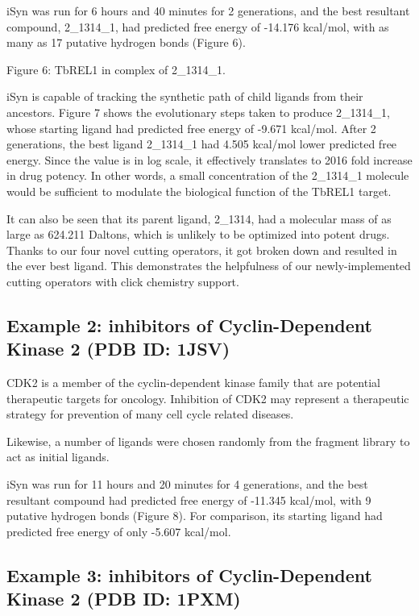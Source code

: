 iSyn was run for 6 hours and 40 minutes for 2 generations, and the best resultant compound, 2\_1314\_1, had predicted free energy of -14.176 kcal/mol, with as many as 17 putative hydrogen bonds (Figure 6).

 
Figure 6: TbREL1 in complex of 2\_1314\_1.

iSyn is capable of tracking the synthetic path of child ligands from their ancestors. Figure 7 shows the evolutionary steps taken to produce 2\_1314\_1, whose starting ligand had predicted free energy of -9.671 kcal/mol. After 2 generations, the best ligand 2\_1314\_1 had 4.505 kcal/mol lower predicted free energy. Since the value is in log scale, it effectively translates to 2016 fold increase in drug potency. In other words, a small concentration of the 2\_1314\_1 molecule would be sufficient to modulate the biological function of the TbREL1 target.

It can also be seen that its parent ligand, 2\_1314, had a molecular mass of as large as 624.211 Daltons, which is unlikely to be optimized into potent drugs. Thanks to our four novel cutting operators, it got broken down and resulted in the ever best ligand. This demonstrates the helpfulness of our newly-implemented cutting operators with click chemistry support.

\subsection{Example 2: inhibitors of Cyclin-Dependent Kinase 2 (PDB ID: 1JSV)}

CDK2 is a member of the cyclin-dependent kinase family that are potential therapeutic targets for oncology. Inhibition of CDK2 may represent a therapeutic strategy for prevention of many cell cycle related diseases.

Likewise, a number of ligands were chosen randomly from the fragment library to act as initial ligands.

iSyn was run for 11 hours and 20 minutes for 4 generations, and the best resultant compound had predicted free energy of -11.345 kcal/mol, with 9 putative hydrogen bonds (Figure 8). For comparison, its starting ligand had predicted free energy of only -5.607 kcal/mol.

\subsection{Example 3: inhibitors of Cyclin-Dependent Kinase 2 (PDB ID: 1PXM)}

